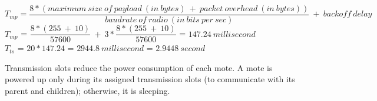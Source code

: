 \begin{equation}
T_{mp} = \frac{8*(maximum\ size\ of\ payload\ (in\ bytes)\ +\ packet\ overhead\ (in\ bytes))}{baudrate\ of\ radio\ (in\ bits\ per\ sec)}\ +\ backoff\ delay
\end{equation}
$T_{mp}$ = $\dfrac{8*(255\ +\ 10)}{57600}\ +\ 3*\dfrac{8*(255\ +\ 10)}{57600}$ = $147.24\ millisecond$\\
$T_{ts}$ = $20*147.24$ = $2944.8\ millisecond$ = $2.9448\ second$


Transmission slots reduce the power consumption of each mote. A mote is powered up only during its assigned transmission slots (to communicate with its parent and children); otherwise, it is sleeping.


